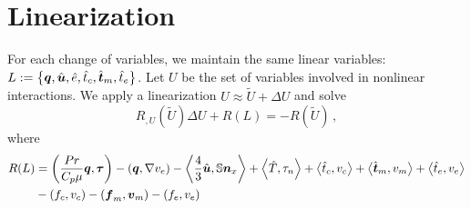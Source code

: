 \documentclass{article}
\begin{document}
\section*{Linearization}
For each change of variables, we maintain the same linear variables: $L:=\left\{ \boldsymbol q,\hat{\boldsymbol u},\hat e,\hat t_c,\hat{\boldsymbol t}_m,\hat t_e \right\}$.
Let $U$ be the set of variables involved in nonlinear interactions.
We apply a linearization $U\approx\tilde U+\Delta U$ and solve
\begin{equation*}
	R_{,U}(\tilde U)\Delta U+R(L)=-R(\tilde U)\,,
\end{equation*}
where
\begin{align*}
R(L)&=
\left( \frac{Pr}{C_p\mu}\boldsymbol q,\boldsymbol\tau \right)
-\left( \boldsymbol q,\nabla v_e \right)
-\left\langle \frac{4}{3}\hat{\boldsymbol u},\mathbb{S}\boldsymbol n_x \right\rangle
+\left\langle \hat T,\tau_n \right\rangle
+\left\langle \hat t_c,v_c \right\rangle
+\left\langle \hat {\boldsymbol t}_m,v_m \right\rangle
+\left\langle \hat t_e,v_e \right\rangle\\
&-\left( f_c,v_c \right)
-\left( \boldsymbol f_m,\boldsymbol v_m \right)
-\left( f_e,v_e \right)
\end{align*}
\end{document}
